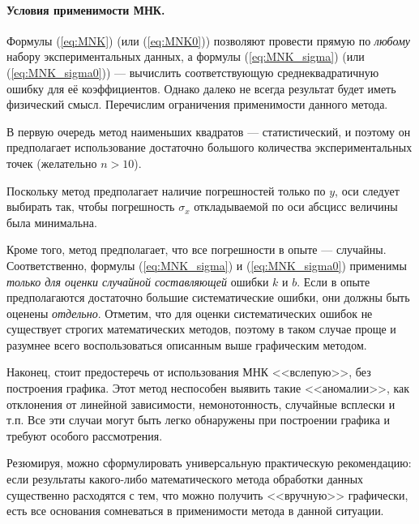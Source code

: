\paragraph{Условия применимости МНК.}

Формулы (\ref{eq:MNK}) (или (\ref{eq:MNK0})) позволяют провести
прямую по \emph{любому} набору экспериментальных данных, а формулы
(\ref{eq:MNK_sigma}) (или (\ref{eq:MNK_sigma0})) --- вычислить
соответствующую среднеквадратичную ошибку для её коэффициентов. Однако
далеко не всегда результат будет иметь физический смысл. Перечислим
ограничения применимости данного метода.

В первую очередь метод наименьших квадратов --- статистический,
и поэтому он предполагает использование достаточно большого количества
экспериментальных точек (желательно $n>10$).

Поскольку метод предполагает наличие погрешностей только по $y$,
оси следует выбирать так, чтобы погрешность $\sigma_{x}$ откладываемой
по оси абсцисс величины была минимальна.

Кроме того, метод предполагает, что все погрешности в опыте ---
случайны. Соответственно, формулы (\ref{eq:MNK_sigma}) и (\ref{eq:MNK_sigma0})
применимы \emph{только для оценки случайной составляющей} ошибки $k$
и $b$. Если в опыте предполагаются достаточно большие систематические
ошибки, они должны быть оценены \emph{отдельно}. Отметим, что для
оценки систематических ошибок не существует строгих математических
методов, поэтому в таком случае проще и разумнее всего воспользоваться
описанным выше графическим методом.

Наконец, стоит предостеречь от использования МНК <<вслепую>>,
без построения графика. Этот метод неспособен выявить такие <<аномалии>>,
как отклонения от линейной зависимости, немонотонность, случайные
всплески и т.п. Все эти случаи могут быть легко обнаружены при построении
графика и требуют особого рассмотрения.

Резюмируя, можно сформулировать универсальную практическую рекомендацию:
если результаты какого-либо математического метода обработки данных
существенно расходятся с тем, что можно получить <<вручную>>
графически, есть все основания сомневаться в применимости метода в
данной ситуации.
